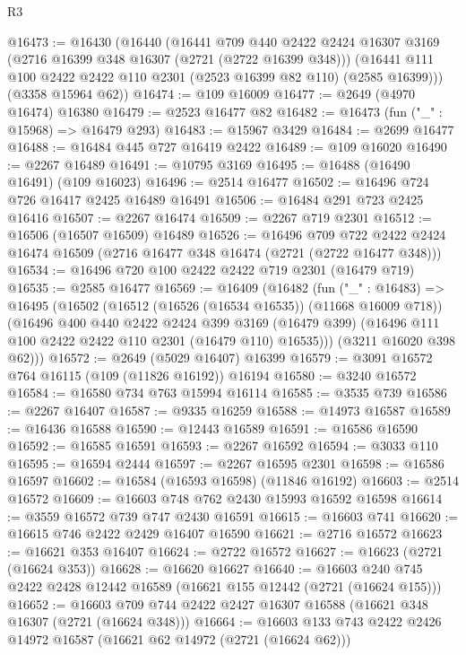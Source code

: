\begin{lexlean}{R3}
\begin{coremodule}
@16473 := @16430
    (@16440
      (@16441
        @709
        @440
        @2422
        @2424
        @16307
        @3169
        (@2716 @16399 @348 @16307 (@2721 (@2722 @16399 @348)))
        (@16441 @111 @100 @2422 @2422 @110 @2301 (@2523 @16399 @82 @110) (@2585 @16399)))
      (@3358 @15964 @62))
@16474 := @109 @16009
@16477 := @2649 (@4970 @16474) @16380
@16479 := @2523 @16477 @82
@16482 := @16473 (fun ("_" : @15968) => @16479 @293)
@16483 := @15967 @3429
@16484 := @2699 @16477
@16488 := @16484 @445 @727 @16419 @2422
@16489 := @109 @16020
@16490 := @2267 @16489
@16491 := @10795 @3169
@16495 := @16488 (@16490 @16491) (@109 @16023)
@16496 := @2514 @16477
@16502 := @16496 @724 @726 @16417 @2425 @16489 @16491
@16506 := @16484 @291 @723 @2425 @16416
@16507 := @2267 @16474
@16509 := @2267 @719 @2301
@16512 := @16506 (@16507 @16509) @16489
@16526 := @16496
    @709
    @722
    @2422
    @2424
    @16474
    @16509
    (@2716 @16477 @348 @16474 (@2721 (@2722 @16477 @348)))
@16534 := @16496 @720 @100 @2422 @2422 @719 @2301 (@16479 @719)
@16535 := @2585 @16477
@16569 := @16409
    (@16482
      (fun ("_" : @16483) =>
      @16495
        (@16502
          (@16512 (@16526 (@16534 @16535)) (@11668 @16009 @718))
          (@16496
            @400
            @440
            @2422
            @2424
            @399
            @3169
            (@16479 @399)
            (@16496 @111 @100 @2422 @2422 @110 @2301 (@16479 @110) @16535)))
        (@3211 @16020 @398 @62)))
@16572 := @2649 (@5029 @16407) @16399
@16579 := @3091 @16572 @764 @16115 (@109 (@11826 @16192)) @16194
@16580 := @3240 @16572
@16584 := @16580 @734 @763 @15994 @16114
@16585 := @3535 @739
@16586 := @2267 @16407
@16587 := @9335 @16259
@16588 := @14973 @16587
@16589 := @16436 @16588
@16590 := @12443 @16589
@16591 := @16586 @16590
@16592 := @16585 @16591
@16593 := @2267 @16592
@16594 := @3033 @110
@16595 := @16594 @2444
@16597 := @2267 @16595 @2301
@16598 := @16586 @16597
@16602 := @16584 (@16593 @16598) (@11846 @16192)
@16603 := @2514 @16572
@16609 := @16603 @748 @762 @2430 @15993 @16592 @16598
@16614 := @3559 @16572 @739 @747 @2430 @16591
@16615 := @16603 @741
@16620 := @16615 @746 @2422 @2429 @16407 @16590
@16621 := @2716 @16572
@16623 := @16621 @353 @16407
@16624 := @2722 @16572
@16627 := @16623 (@2721 (@16624 @353))
@16628 := @16620 @16627
@16640 := @16603 @240 @745 @2422 @2428 @12442 @16589 (@16621 @155 @12442 (@2721 (@16624 @155)))
@16652 := @16603 @709 @744 @2422 @2427 @16307 @16588 (@16621 @348 @16307 (@2721 (@16624 @348)))
@16664 := @16603 @133 @743 @2422 @2426 @14972 @16587 (@16621 @62 @14972 (@2721 (@16624 @62)))

\end{coremodule}
\end{lexlean}
